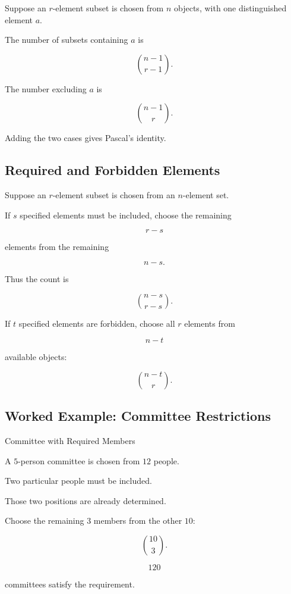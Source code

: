 Suppose an \(r\)-element subset is chosen from \(n\) objects, with one
distinguished element \(a\).

The number of subsets containing \(a\) is

\[
\boxed{
\binom{n-1}{r-1}.
}
\]

The number excluding \(a\) is

\[
\boxed{
\binom{n-1}{r}.
}
\]

Adding the two cases gives Pascal's identity.

\subsection{Required and Forbidden Elements}
\label{subsec:required-forbidden-elements}

Suppose an \(r\)-element subset is chosen from an \(n\)-element set.

If \(s\) specified elements must be included, choose the remaining

\[
r-s
\]

elements from the remaining

\[
n-s.
\]

Thus the count is

\[
\boxed{
\binom{n-s}{r-s}.
}
\]

If \(t\) specified elements are forbidden, choose all \(r\) elements
from

\[
n-t
\]

available objects:

\[
\boxed{
\binom{n-t}{r}.
}
\]

\subsection{Worked Example: Committee Restrictions}
\label{subsec:worked-committee-restrictions}

\begin{workedexamplebox}{Committee with Required Members}

A \(5\)-person committee is chosen from \(12\) people.

Two particular people must be included.

Those two positions are already determined.

Choose the remaining \(3\) members from the other \(10\):

\[
\binom{10}{3}.
\]

\begin{answerbox}
\[
\boxed{
120
}
\]

committees satisfy the requirement.
\end{answerbox}

\end{workedexamplebox}

